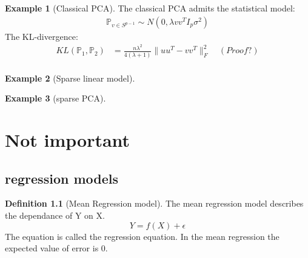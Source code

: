 \documentclass[a4paper,12pt, oneside, fleqn]{book}
\theoremstyle{definition}
\newtheorem{definition}{Definition}[section]
\newtheorem*{example}{Example}
\theoremstyle{remark}
\begin{document}
\begin{example}[Classical PCA]
	The classical PCA admits the statistical model:
	\begin{align*}
		\mathbb{P}_{v \in S^{p-1}} \sim N(0, \lambda v v^T I_p \sigma^2)
	\end{align*}
	The KL-divergence:
	\begin{align*}
		KL(\mathbb{P}_1, \mathbb{P}_2) &= \frac{n\lambda^2}{4(\lambda + 1)}\|uu^T - vv^T\|_F^2\quad (Proof?)\\
		&\
	\end{align*}
\end{example}


\begin{example}[Sparse linear model]
\end{example}

\begin{example}[sparse PCA]	
\end{example}








\chapter{Not important}
\section{regression models}
\begin{definition}[Mean Regression model]
	The mean regression model describes the dependance of Y on X.
	\begin{equation}
		Y = f(X) + \epsilon
	\end{equation}
	The equation is called the regression equation. In the mean regression the expected value of error is 0.
\end{definition}
\end{document}
